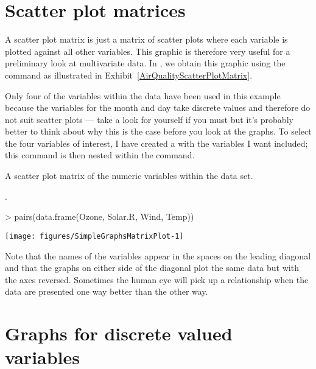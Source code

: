 \section{Scatter plot matrices} 
\label{ScatterPlotMatrices} 
 
A scatter plot matrix is just a matrix of scatter plots where each variable is plotted against all other variables. This graphic is therefore very useful for a preliminary look at multivariate data. In \R{}, we obtain this graphic using the  command as illustrated in Exhibit~\ref{AirQualityScatterPlotMatrix}. 
 
Only four of the variables within the  data have been used in this example because the variables for the month and day take discrete values and therefore do not suit scatter plots --- take a look for yourself if you must but it's probably better to think about why this is the case before you look at the graphs. To select the four variables of interest, I have created a  with the variables I want included; this  command is then nested within the  command. 
\begin{exhibit} 
\begin{center} 
\caption{A scatter plot matrix of the numeric variables within the  data set.} 
\label{AirQualityScatterPlotMatrix}. 

\begin{Schunk}
\begin{Sinput}
> pairs(data.frame(Ozone, Solar.R, Wind, Temp)) 
\end{Sinput}

\texttt{[image: figures/SimpleGraphsMatrixPlot-1]} \end{Schunk}

\end{center} 
\end{exhibit} 
 
Note that the names of the variables appear in the spaces on the leading diagonal and that the graphs on either side of the diagonal plot the same data but with the axes reversed. Sometimes the human eye will pick up a relationship when the data are presented one way better than the other way. 
 
\section{Graphs for discrete valued variables} 
 
